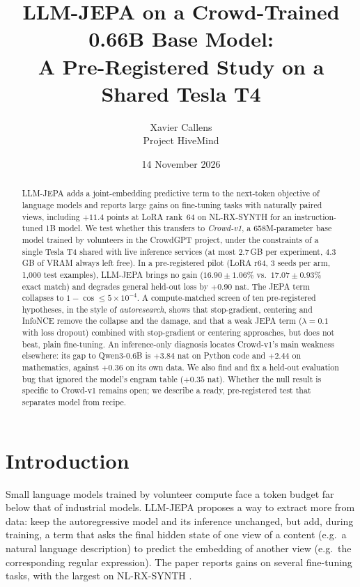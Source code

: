 \documentclass[11pt]{article}
\title{LLM-JEPA on a Crowd-Trained 0.66B Base Model:\\
A Pre-Registered Study on a Shared Tesla T4}
\author{Xavier Callens\\ \small Project HiveMind}
\date{14 November 2026}
\begin{document}
\maketitle

\begin{abstract}
LLM-JEPA adds a joint-embedding predictive term to the next-token objective of language models and reports large gains
on fine-tuning tasks with naturally paired views, including $+11.4$ points at LoRA rank~64 on NL-RX-SYNTH for an
instruction-tuned 1B model. We test whether this transfers to \emph{Crowd-v1}, a 658M-parameter base model trained by
volunteers in the CrowdGPT project, under the constraints of a single Tesla T4 shared with live inference services (at
most 2.7\,GB per experiment, 4.3\,GB of VRAM always left free).
In a pre-registered pilot (LoRA r64, 3 seeds per arm, 1{,}000 test examples), LLM-JEPA brings no gain
($16.90\pm1.06\%$ vs.\ $17.07\pm0.93\%$ exact match) and degrades general held-out loss by $+0.90$ nat. The JEPA term
collapses to $1-\cos\le5\times10^{-4}$. A compute-matched screen of ten pre-registered hypotheses, in the style of
\emph{autoresearch}, shows that stop-gradient, centering and InfoNCE remove the collapse and the damage, and that a
weak JEPA term ($\lambda=0.1$ with loss dropout) combined with stop-gradient or centering approaches, but does not
beat, plain fine-tuning. An inference-only diagnosis locates Crowd-v1's main weakness elsewhere: its gap to
Qwen3-0.6B is $+3.84$ nat on Python code and $+2.44$ on mathematics, against $+0.36$ on its own data. We also find and
fix a held-out evaluation bug that ignored the model's engram table ($+0.35$ nat). Whether the null result is specific to
Crowd-v1 remains open; we describe a ready, pre-registered test that separates model from recipe.
\end{abstract}

\section{Introduction}
Small language models trained by volunteer compute face a token budget far below that of industrial models. LLM-JEPA
\cite{huang2025llmjepa} proposes a way to extract more from data: keep the autoregressive model and its inference
unchanged, but add, during training, a term that asks the final hidden state of one view of a content (e.g.\ a natural
language description) to predict the embedding of another view (e.g.\ the corresponding regular expression). The paper
reports gains on several fine-tuning tasks, with the largest on NL-RX-SYNTH \cite{locascio2016nlrx}.
\end{document}
